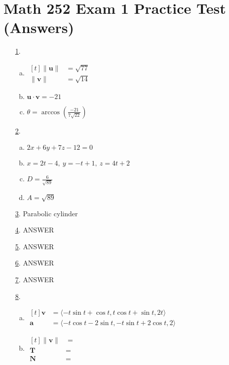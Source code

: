 \documentclass[fleqn]{article}
\renewcommand{\vec}[1]{\mathbf{#1}}
\begin{document}
\section*{Math 252 Exam 1 Practice Test (Answers)}
\begin{itemize}

\item[\hyperlink{1-problem}{1}.]\hypertarget{1-answer}{}\begin{enumerate}[a.]
  \item
    \(\begin{aligned}[t]
      \|\vec u\|&=\sqrt{77} \\
      \|\vec v\|&=\sqrt{14}
    \end{aligned}\)
  \item \(\vec u\cdot\vec v=-21\)
  \item \(\theta=\arccos\left(\frac{-21}{7\sqrt{22}}\right)\)
\end{enumerate}
\smallskip

\item[\hyperlink{2-problem}{2}.]\hypertarget{2-answer}{}\begin{enumerate}[a.]
  \item \(2x+6y+7z-12=0\)
  \item \(x=2t-4,\ y=-t+1,\ z=4t+2\)
  \item \(D=\frac{6}{\sqrt{89}}\)
  \item \(A=\sqrt{89}\)
\end{enumerate}
\smallskip

\item[\hyperlink{3-problem}{3}.]\hypertarget{3-answer}{}Parabolic cylinder
\smallskip

\item[\hyperlink{4-problem}{4}.]\hypertarget{4-answer}{}ANSWER
\smallskip

\item[\hyperlink{5-problem}{5}.]\hypertarget{5-answer}{}ANSWER
\smallskip

\item[\hyperlink{6-problem}{6}.]\hypertarget{6-answer}{}ANSWER
\smallskip

\item[\hyperlink{7-problem}{7}.]\hypertarget{7-answer}{}ANSWER
\smallskip

\item[\hyperlink{8-problem}{8}.]\hypertarget{8-answer}{}\begin{enumerate}[a.]
  \item
    \(\begin{aligned}[t]
      \vec v&=\langle-t\sin t+\cos t,t\cos t+\sin t,2t\rangle \\
      \vec a&=\langle-t\cos t-2\sin t,-t\sin t+2\cos t,2\rangle
    \end{aligned}\)
  \item
    \(\begin{aligned}[t]
      \|\vec v\|&=\frac{}{} \\
      \vec T&= \\
      \vec N&=
    \end{aligned}\)
\end{enumerate}
\smallskip
\end{itemize}
\end{document}
